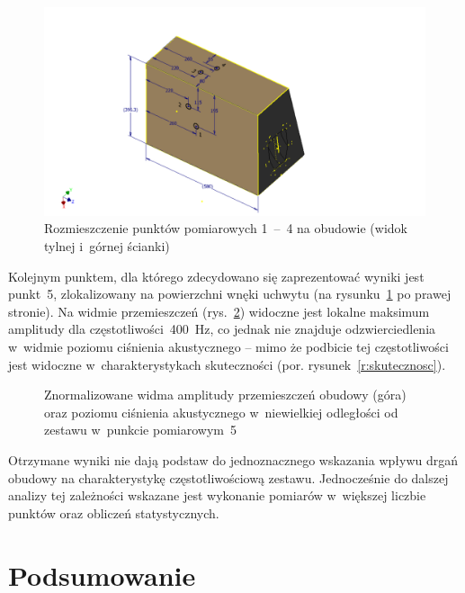 \documentclass[12pt]{oska}
\newcommand{\range}[2]{\num{#1}~--~\num{#2}}
\begin{document}
		\begin{figure}[H]
			\centering
			\includegraphics[width=.8\textwidth,trim={5cm .3cm 5cm 2.7cm},clip]{wibrometr.pdf}
			\caption{Rozmieszczenie punktów pomiarowych \range{1}{4} na obudowie (widok tylnej i~górnej ścianki)}
			\label{r:wibro_pkt}
		\end{figure}
		
		Kolejnym punktem, dla którego zdecydowano się zaprezentować wyniki jest punkt~\num{5}, zlokalizowany na powierzchni wnęki uchwytu (na rysunku~\ref{r:wibro_pkt} po prawej stronie). Na widmie przemieszczeń (rys.~\ref{r:wibrometr_5}) widoczne jest lokalne maksimum amplitudy dla częstotliwości~\SI{400}{\hertz}, co jednak nie znajduje odzwierciedlenia w~widmie poziomu ciśnienia akustycznego -- mimo że podbicie tej częstotliwości jest widoczne w~charakterystykach skuteczności (por. rysunek~\ref{r:skutecznosc}).%
		
		\begin{figure}[H]
		\centering
		\caption{Znormalizowane widma amplitudy przemieszczeń obudowy (góra) oraz poziomu ciśnienia akustycznego w~niewielkiej odległości od zestawu w~punkcie pomiarowym~\num{5}}
		\label{r:wibrometr_5}
		\end{figure}
		
		Otrzymane wyniki nie dają podstaw do jednoznacznego wskazania wpływu drgań obudowy na charakterystykę częstotliwościową zestawu. Jednocześnie do dalszej analizy tej zależności wskazane jest wykonanie pomiarów w~większej liczbie punktów oraz obliczeń statystycznych.

\section{Podsumowanie}

\printbibliography
\end{document}
